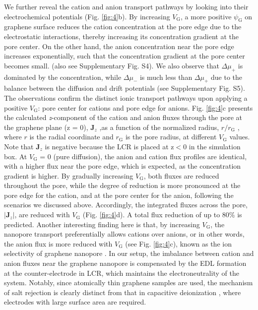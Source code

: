 \documentclass[journal=langd5,email=true, hyperref=true, keywords=false]{achemso}
\newcommand{\Fig}{Fig.}
\begin{document}
We further reveal the cation and anion transport pathways by looking
into their electrochemical potentials (\Fig{} \ref{fig:4}b). By
increasing $V_{\mathrm{G}}$, a more positive $\psi_{\mathrm{G}}$ on
graphene surface reduces the cation concentration at the pore edge due
to the electrostatic interactions, thereby increasing its
concentration gradient at the pore center. On the other hand, the
anion concentration near the pore edge increases exponentially, such
that the concentration gradient at the pore center becomes
small. (also see Supplementary \Fig{} S4). We also observe that
$\Delta \mu_{+}$ is dominated by the concentration, while
$\Delta \mu_{-}$ is much less than $\Delta \mu_{+}$ due to the balance
between the diffusion and drift potentials (see Supplementary \Fig{}
S5). The observations confirm the distinct ionic transport pathways
upon applying a positive $V_{\mathrm{G}}$: pore center for cations and
pore edge for anions. \Fig{} \ref{fig:4}c presents the calculated
\textit{z}-component of the cation and anion fluxes through the pore
at the graphene plane (z = 0), $\boldsymbol{J}_{z}$ ,as a function of
the normalized radius, $r/r_{\mathrm{G}}$ , where $r$ is the radial
coordinate and $r_{\mathrm{G}}$ is the pore radius, at different
$V_{\mathrm{G}}$ values. Note that $\boldsymbol{J}_{z}$ is negative
because the LCR is placed at z$<$0 in the simulation box. At
$V_{\mathrm{G}}$ = 0 (pure diffusion), the anion and cation flux
profiles are identical, with a higher flux near the pore edge, which
is expected, as the concentration gradient is higher. By gradually
increasing $V_{\mathrm{G}}$, both fluxes are reduced throughout the
pore, while the degree of reduction is more pronounced at the pore
edge for the cation, and at the pore center for the anion, following
the scenarios we discussed above. Accordingly, the integrated fluxes
across the pore, $|\boldsymbol{J}_{z}|$, are reduced with
$V_{\mathrm{G}}$ (\Fig{} \ref{fig:4}d). A total flux reduction of up
to 80\% is predicted. Another interesting finding here is that, by
increasing $V_{\mathrm{G}}$, the nanopore transport preferentially
allows cations over anions, or in other words, the anion flux is more
reduced with $V_{\mathrm{G}}$ (see \Fig{} \ref{fig:4}c), known as the
ion selectivity of graphene nanopore \cite{Rollings_2016}. In our setup, the imbalance between cation and anion
fluxes near the graphene nanopore is compensated by the EDL formation
at the counter-electrode in LCR, which maintains the electroneutrality
of the system. Notably, since atomically thin graphene samples are
used, the mechanism of salt rejection is clearly distinct from that in
capacitive deionization \cite{Biesheuvel_2010}, where electrodes with large
surface area are required.
\end{document}
